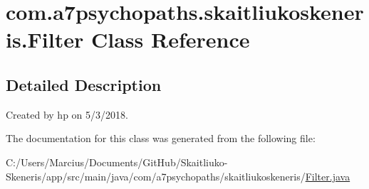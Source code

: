 \hypertarget{classcom_1_1a7psychopaths_1_1skaitliukoskeneris_1_1_filter}{}\section{com.\+a7psychopaths.\+skaitliukoskeneris.\+Filter Class Reference}
\label{classcom_1_1a7psychopaths_1_1skaitliukoskeneris_1_1_filter}


\subsection{Detailed Description}
Created by hp on 5/3/2018. 

The documentation for this class was generated from the following file\+:\begin{DoxyCompactItemize}
\item 
C\+:/\+Users/\+Marcius/\+Documents/\+Git\+Hub/\+Skaitliuko-\/\+Skeneris/app/src/main/java/com/a7psychopaths/skaitliukoskeneris/\mbox{\hyperlink{_filter_8java}{Filter.\+java}}\end{DoxyCompactItemize}
